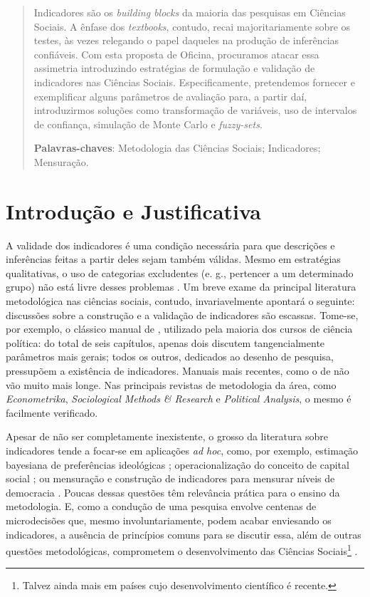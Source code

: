 \documentclass[article,12pt,oneside,a4paper,english,brazilian]{abntex2}
\author{Fernando Meireles}
\begin{document}
\imprimirfolhaderosto
\frenchspacing 

\begin{abstract}
Indicadores são os \emph{building blocks} da maioria das pesquisas em Ciências Sociais. A ênfase dos \emph{textbooks}, contudo, recai majoritariamente sobre os testes, às vezes relegando o papel daqueles na produção de inferências confiáveis. Com esta proposta de Oficina, procuramos atacar essa assimetria introduzindo estratégias de formulação e validação de indicadores nas Ciências Sociais. Especificamente, pretendemos fornecer e exemplificar alguns parâmetros de avaliação para, a partir daí, introduzirmos soluções como transformação de variáveis, uso de intervalos de confiança, simulação de Monte Carlo e \emph{fuzzy-sets}.
 
\vspace{\onelineskip}
\noindent
\textbf{Palavras-chaves}: Metodologia das Ciências Sociais; Indicadores;  Mensuração.
\end{abstract}
\textual

\section{Introdução e Justificativa}

A validade dos indicadores é uma condição necessária para que descrições e inferências feitas a partir deles sejam também válidas. Mesmo em estratégias qualitativas, o uso de categorias excludentes (e. g., pertencer a um determinado grupo) não está livre desses problemas \cite{ragin2000fuzzy}. Um breve exame da principal literatura metodológica nas ciências sociais, contudo, invariavelmente apontará o seguinte: discussões sobre a construção e a validação de indicadores são escassas. Tome-se, por exemplo, o clássico manual de , utilizado pela maioria dos cursos de ciência política: do total de seis capítulos, apenas dois discutem tangencialmente parâmetros mais gerais; todos os outros, dedicados ao desenho de pesquisa, pressupõem a existência de indicadores. Manuais mais recentes, como o de  não vão muito mais longe. Nas principais revistas de metodologia da área, como \emph{Econometrika}, \emph{Sociological Methods \& Research} e \emph{Political Analysis}, o mesmo é facilmente verificado. 

Apesar de não ser completamente inexistente, o grosso da literatura sobre indicadores tende a focar-se em aplicações \emph{ad hoc}, como, por exemplo, estimação bayesiana de preferências ideológicas \cite{martin2002}; operacionalização do conceito de capital social \cite{paldam2000}; ou mensuração e construção de indicadores para mensurar níveis de democracia \cite{coppedge2011,treier2008}. Poucas dessas questões têm relevância prática para o ensino da metodologia. E, como a condução de uma pesquisa envolve centenas de microdecisões que, mesmo involuntariamente, podem acabar enviesando os indicadores, a ausência de princípios comuns para se discutir essa, além de outras questões metodológicas, comprometem o desenvolvimento das Ciências Sociais\footnote{Talvez ainda mais em países cujo desenvolvimento científico é recente.} \cite{king1989}. 
\end{document}
